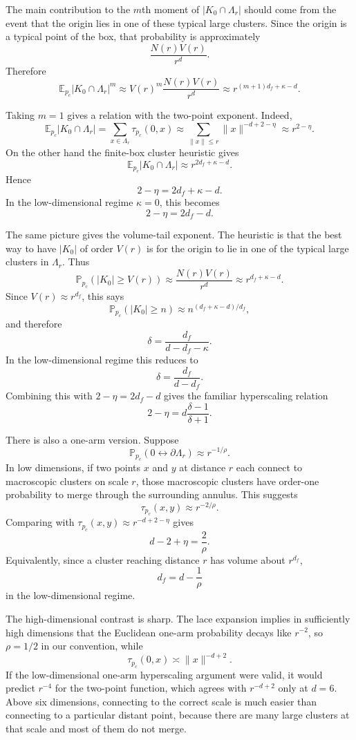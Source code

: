 \documentclass[11pt,reqno]{book}
\numberwithin{equation}{chapter}
\theoremstyle{plain}
\theoremstyle{definition}
\theoremstyle{remark}
\newcommand{\Pc}{\mathbb P_{p_c}}
\newcommand{\E}{\mathbb E}
\newcommand{\1}{\mathbf 1}
\newcommand{\norm}[1]{\lVert #1\rVert}
\newcommand{\as}{\asymp}
\begin{document}
The main contribution to the $m$th moment of $|K_0\cap\Lambda_r|$ should come from the event that the origin lies in one of these typical large clusters. Since the origin is a typical point of the box, that probability is approximately
\[
  \frac{N(r)V(r)}{r^d}.
\]
Therefore
\[
  \E_{p_c}|K_0\cap\Lambda_r|^m
  \approx
  V(r)^m \frac{N(r)V(r)}{r^d}
  \approx
  r^{(m+1)d_f+\kappa-d}.
\]

Taking $m=1$ gives a relation with the two-point exponent. Indeed,
\[
  \E_{p_c}|K_0\cap\Lambda_r|
  =
  \sum_{x\in\Lambda_r}\tau_{p_c}(0,x)
  \approx
  \sum_{\norm{x}\leq r}\norm{x}^{-d+2-\eta}
  \approx
  r^{2-\eta}.
\]
On the other hand the finite-box cluster heuristic gives
\[
  \E_{p_c}|K_0\cap\Lambda_r|
  \approx
  r^{2d_f+\kappa-d}.
\]
Hence
\[
  2-\eta=2d_f+\kappa-d.
\]
In the low-dimensional regime $\kappa=0$, this becomes
\[
  2-\eta=2d_f-d.
\]

The same picture gives the volume-tail exponent. The heuristic is that the best way to have $|K_0|$ of order $V(r)$ is for the origin to lie in one of the typical large clusters in $\Lambda_r$. Thus
\[
  \Pc(|K_0|\geq V(r))
  \approx
  \frac{N(r)V(r)}{r^d}
  \approx
  r^{d_f+\kappa-d}.
\]
Since $V(r)\approx r^{d_f}$, this says
\[
  \Pc(|K_0|\geq n)
  \approx
  n^{(d_f+\kappa-d)/d_f},
\]
and therefore
\[
  \delta=\frac{d_f}{d-d_f-\kappa}.
\]
In the low-dimensional regime this reduces to
\[
  \delta=\frac{d_f}{d-d_f}.
\]
Combining this with $2-\eta=2d_f-d$ gives the familiar hyperscaling relation
\[
  2-\eta=d\frac{\delta-1}{\delta+1}.
\]

There is also a one-arm version. Suppose
\[
  \Pc(0\leftrightarrow \partial\Lambda_r)\approx r^{-1/\rho}.
\]
In low dimensions, if two points $x$ and $y$ at distance $r$ each connect to macroscopic clusters on scale $r$, those macroscopic clusters have order-one probability to merge through the surrounding annulus. This suggests
\[
  \tau_{p_c}(x,y)\approx r^{-2/\rho}.
\]
Comparing with $\tau_{p_c}(x,y)\approx r^{-d+2-\eta}$ gives
\[
  d-2+\eta=\frac2\rho.
\]
Equivalently, since a cluster reaching distance $r$ has volume about $r^{d_f}$,
\[
  d_f=d-\frac1\rho
\]
in the low-dimensional regime.

The high-dimensional contrast is sharp. The lace expansion implies in sufficiently high dimensions that the Euclidean one-arm probability decays like $r^{-2}$, so $\rho=1/2$ in our convention, while
\[
  \tau_{p_c}(0,x)\as \norm{x}^{-d+2}.
\]
If the low-dimensional one-arm hyperscaling argument were valid, it would predict $r^{-4}$ for the two-point function, which agrees with $r^{-d+2}$ only at $d=6$. Above six dimensions, connecting to the correct scale is much easier than connecting to a particular distant point, because there are many large clusters at that scale and most of them do not merge.
\end{document}
